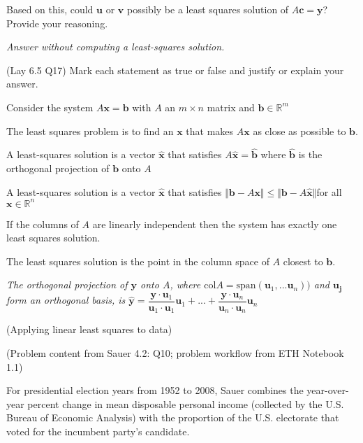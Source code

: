\documentclass[12pt,letterpaper,noanswers]{exam}
\newcommand{\mathbf}[1]{\boldsymbol{#1}}
\begin{document}
\begin{questions}
\begin{parts}
    Based on this, could $\mathbf{u}$ or $\mathbf{v}$ possibly be a least squares solution of $A\mathbf{c} = \mathbf{y}$?  Provide your reasoning.
    \end{parts}  

\emph{Answer without computing a least-squares solution.}


\question (Lay 6.5 Q17)
Mark each statement as true or false and justify or explain your answer.

Consider the system $A\mathbf{x} = \mathbf{b}$ with $A$ an $m\times n$ matrix and $\mathbf{b}\in\mathbb{R}^m$
\begin{parts}
    \item The least squares problem is to find an $\mathbf{x}$ that makes $A\mathbf{x}$ as close as possible to $\mathbf{b}$.
    \item A least-squares solution is a vector $\hat{\mathbf{x}}$ that satisfies  $A\hat{\mathbf{x}} = \hat{\mathbf{b}}$ where $\hat{\mathbf{b}}$ is the orthogonal projection of $\mathbf{b}$ onto $A$
    \item  A least-squares solution is a vector $\hat{\mathbf{x}}$ that satisfies  $\Vert \mathbf{b}-A{\mathbf{x}}\Vert \leq\Vert \mathbf{b}-A\hat{\mathbf{x}}\Vert$for all $\mathbf{x}\in\mathbb{R}^n$
    \item If the columns of $A$ are linearly independent then the system has exactly one least squares solution.
    \item The least squares solution is the point in the column space of $A$ closest to $\mathbf{b}$.

\end{parts}

\emph{The orthogonal projection of $\mathbf{y}$ onto $A$, where $\text{col} A = \text{span}(\mathbf{u}_1,...\mathbf{u}_n))$ and $\mathbf{u_j}$ form an orthogonal basis, is $\hat{\mathbf{y}} = \dfrac{\mathbf{y}\cdot\mathbf{u}_1}{\mathbf{u}_1\cdot\mathbf{u}_1}\mathbf{u}_1+...+\dfrac{\mathbf{y}\cdot\mathbf{u}_n}{\mathbf{u}_n\cdot\mathbf{u}_n}\mathbf{u}_n$}

\question (Applying linear least squares to data) 

(Problem content from Sauer 4.2: Q10; problem workflow from ETH Notebook 1.1) 

For presidential election years from 1952 to 2008, Sauer combines the year-over-year percent change in mean disposable personal income (collected by the U.S. Bureau of Economic Analysis) with the proportion of the U.S. electorate that voted for the incumbent party's candidate.  


\end{questions}
\end{document}
